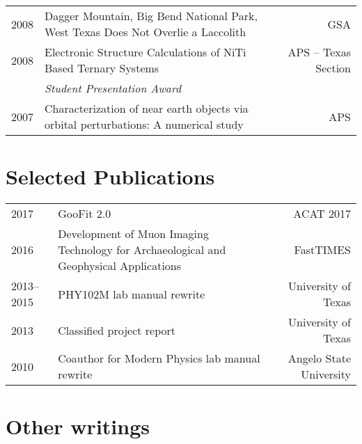 \documentclass[10pt,letterpaper,english]{moderncv}
\begin{document}
\begin{tabularx}{\textwidth}{p{.35in}Xr}
	  2008 & Dagger Mountain, Big Bend National Park, West Texas Does Not Overlie a Laccolith & GSA \\[1em]
	 
	 2008 & Electronic Structure Calculations of NiTi Based Ternary Systems  & APS -- Texas Section \\
	 & \emph{Student Presentation Award} & \\[1ex]
	 
	 2007 & Characterization of near earth objects via orbital perturbations: A numerical study & APS \\
	 
\end{tabularx}





\section{Selected Publications}

\begin{tabularx}{\textwidth}{p{.8in}Xr}

2017 & GooFit 2.0 & ACAT 2017 \\ %
2016 & Development of Muon Imaging Technology
for Archaeological and Geophysical Applications & FastTIMES \\
2013--2015 & PHY102M lab manual rewrite & University of Texas \\
2013 & Classified project report & University of Texas\\
2010 & Coauthor for Modern Physics lab manual rewrite & Angelo State University\\
\end{tabularx}

\section{Other writings}
\end{document}
